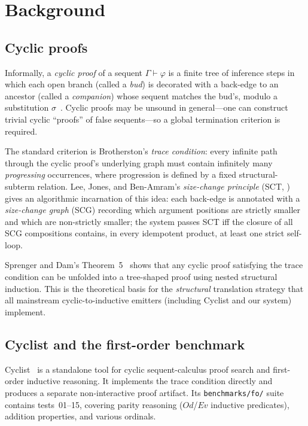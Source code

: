 \section{Background}
\label{sec:background}

\subsection{Cyclic proofs}

Informally, a \emph{cyclic proof} of a sequent \(\Gamma \vdash \varphi\) is a
finite tree of inference steps in which each open branch (called a \emph{bud})
is decorated with a back-edge to an ancestor (called a \emph{companion})
whose sequent matches the bud's, modulo a substitution
\(\sigma\)~\cite{brotherston2006phd}. Cyclic proofs may be unsound in
general---one can construct trivial cyclic ``proofs'' of false
sequents---so a global termination criterion is required.

The standard criterion is Brotherston's \emph{trace condition}: every
infinite path through the cyclic proof's underlying graph must contain
infinitely many \emph{progressing} occurrences, where progression is defined
by a fixed structural-subterm relation. Lee, Jones, and Ben-Amram's
\emph{size-change principle} (SCT, \cite{lee2001size}) gives an algorithmic
incarnation of this idea: each back-edge is annotated with a
\emph{size-change graph} (SCG) recording which argument positions are
strictly smaller and which are non-strictly smaller; the system passes SCT iff
the closure of all SCG compositions contains, in every idempotent product, at
least one strict self-loop.

Sprenger and Dam's Theorem~5~\cite{sprenger2003structure} shows that any
cyclic proof satisfying the trace condition can be unfolded into a
tree-shaped proof using nested structural induction. This is the theoretical
basis for the \emph{structural} translation strategy that all
mainstream cyclic-to-inductive emitters (including Cyclist and our system)
implement.

\subsection{Cyclist and the first-order benchmark}

Cyclist~\cite{brotherston2012cyclist} is a standalone tool for cyclic
sequent-calculus proof search and first-order inductive reasoning. It
implements the trace condition directly and produces a separate
non-interactive proof artifact. Its \texttt{benchmarks/fo/} suite contains
tests~01--15, covering parity reasoning (\(\mathit{Od}\)/\(\mathit{Ev}\)
inductive predicates), addition properties, and various ordinals.

